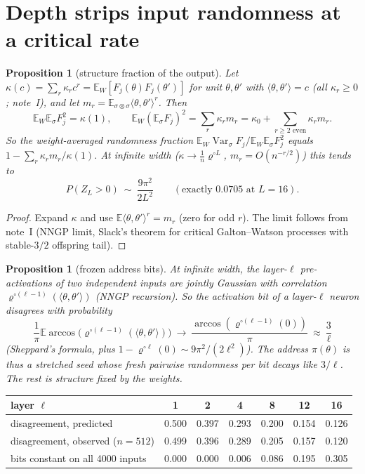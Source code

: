 \documentclass[11pt]{article}
\newtheorem{proposition}[theorem]{Proposition}
\theoremstyle{definition}
\theoremstyle{remark}
\newcommand{\E}{\mathbb E}
\newcommand{\Var}{\operatorname{Var}}
\begin{document}
\section{Depth strips input randomness at a critical rate}\label{sec:strip}

\begin{proposition}[structure fraction of the output]\label{prop:frac}
Let $\kappa(c)=\sum_r\kappa_rc^r=\E_W[F_j(\theta)F_j(\theta')]$ for unit $\theta,\theta'$ with $\langle\theta,\theta'\rangle=c$ (all $\kappa_r\ge0$; note~I), and let $m_r=\E_{\sigma\otimes\sigma}\langle\theta,\theta'\rangle^r$. Then
\[\E_W\E_\sigma F_j^2=\kappa(1),\qquad \E_W(\E_\sigma F_j)^2=\sum_r\kappa_rm_r=\kappa_0+\sum_{r\ge2\text{ even}}\kappa_rm_r.\]
So the weight-averaged randomness fraction $\E_W\Var_\sigma F_j/\E_W\E_\sigma F_j^2$ equals $1-\sum_r\kappa_rm_r/\kappa(1)$. At infinite width ($\kappa\to\frac1n\varrho^{\circ L}$, $m_r=O(n^{-r/2})$) this tends to
\[P(Z_L>0)\ \sim\ \frac{9\pi^2}{2L^2}\qquad(\text{exactly }0.0705\text{ at }L=16).\]
\end{proposition}

\begin{proof}
Expand $\kappa$ and use $\E\langle\theta,\theta'\rangle^r=m_r$ (zero for odd $r$). The limit follows from note~I (NNGP limit, Slack's theorem for critical Galton--Watson processes with stable-$3/2$ offspring tail).
\end{proof}

\begin{proposition}[frozen address bits]\label{prop:frozen}
At infinite width, the layer-$\ell$ pre-activations of two independent inputs are jointly Gaussian with correlation $\varrho^{\circ(\ell-1)}(\langle\theta,\theta'\rangle)$ (NNGP recursion). So the activation bit of a layer-$\ell$ neuron disagrees with probability
\[\frac1\pi\E\arccos\big(\varrho^{\circ(\ell-1)}(\langle\theta,\theta'\rangle)\big)\ \to\ \frac{\arccos(\varrho^{\circ(\ell-1)}(0))}{\pi}\ \approx\ \frac3\ell\]
(Sheppard's formula, plus $1-\varrho^{\circ\ell}(0)\sim9\pi^2/(2\ell^2)$). The address $\pi(\theta)$ is thus a stretched seed whose fresh pairwise randomness per bit decays like $3/\ell$. The rest is structure fixed by the weights.
\end{proposition}

\begin{center}
\begin{tabular}{lcccccc}
\toprule
layer $\ell$ & 1 & 2 & 4 & 8 & 12 & 16\\
\midrule
disagreement, predicted & 0.500 & 0.397 & 0.293 & 0.200 & 0.154 & 0.126\\
disagreement, observed ($n=512$) & 0.499 & 0.396 & 0.289 & 0.205 & 0.157 & 0.120\\
bits constant on all 4000 inputs & 0.000 & 0.000 & 0.006 & 0.086 & 0.195 & 0.305\\
\bottomrule
\end{tabular}
\end{center}
\end{document}
